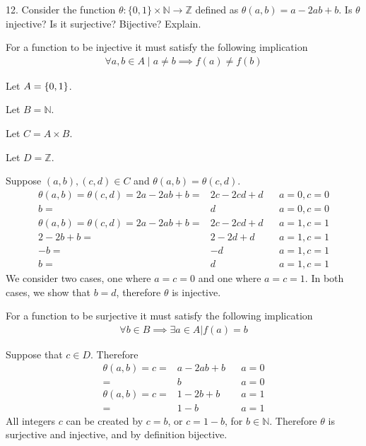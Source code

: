 \documentclass{idrisMemo}
\newcommand{\inj}{
\item For a function to be injective it must satisfy the following implication
\begin{align*}
    \forall a,b \in A\mid a\neq b\implies f(a)\neq f(b)
\end{align*}
}
\newcommand{\surj}{
\item For a function to be surjective it must satisfy the following implication
\begin{align*}
    \forall b \in B \implies \exists a \in A | f(a) = b
\end{align*}
}
\begin{document}
\begin{prooflist}{12. Consider the function $\theta:\{0,1\} \times \mathbb{N}
    \rightarrow \mathbb{Z}$ defined as $\theta(a, b)=a-2 a b+b$. Is $\theta$
injective? Is it surjective? Bijective? Explain.}
\inj{}
\item Let $A=\{0,1\}$.
\item Let $B=\mathbb{N}$.
\item Let $C=A\times B$.
\item Let $D=\mathbb{Z}$.
\item Suppose $(a, b), (c, d) \in C$ and $\theta(a, b)=\theta(c, d)$.
\begin{align*}
    \theta(a, b)=\theta(c, d)=2a - 2ab+b =& 2c - 2cd+d&&a=0,c=0\\
    b =& d&&a=0,c=0\\
    \theta(a, b)=\theta(c, d)=2a - 2ab+b =& 2c - 2cd+d&&a=1,c=1\\
    2 - 2b+b =& 2 - 2d+d&&a=1,c=1\\
    -b =& -d&&a=1,c=1\\
    b =& d&&a=1,c=1
\end{align*}
We consider two cases, one where $a=c=0$ and one where $a=c=1$. In both cases, we
show that $b=d$, therefore $\theta$ is injective.
\surj{}
\item Suppose that $c\in D$. Therefore
\begin{align*}
    \theta(a, b)=c = & a - 2ab+b &  & a=0 \\
    =           & b         &  & a=0 \\
    \theta(a, b)=c = & 1 - 2b+b  &  & a=1 \\
    =           & 1-b       &  & a=1
\end{align*}
All integers $c$ can be created by $c=b$, or $c=1-b$, for $b\in\mathbb{N}$.
Therefore $\theta$ is surjective and injective, and by definition bijective.
\end{prooflist}
\end{document}
